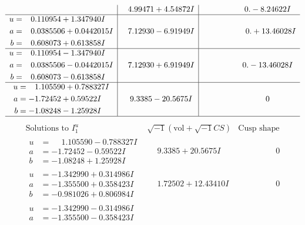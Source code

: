 \documentclass[1p]{elsarticle_modified}
\theoremstyle{definition}
\newcommand{\I}{\sqrt{-1}}
\begin{document}
$$\begin{array}{c|c|c}
 & \phantom{-}4.99471 + 4.54872 I & \phantom{-0.000000 } 0. - 8.24622 I \\ \hline\begin{aligned}
u &= \phantom{-}0.110954 + 1.347940 I \\
a &= \phantom{-}0.0385506 + 0.0442015 I \\
b &= \phantom{-}0.608073 + 0.613858 I\end{aligned}
 & \phantom{-}7.12930 - 6.91949 I & \phantom{-0.000000 -}0. + 13.46028 I \\ \hline\begin{aligned}
u &= \phantom{-}0.110954 - 1.347940 I \\
a &= \phantom{-}0.0385506 - 0.0442015 I \\
b &= \phantom{-}0.608073 - 0.613858 I\end{aligned}
 & \phantom{-}7.12930 + 6.91949 I & \phantom{-0.000000 } 0. - 13.46028 I \\ \hline\begin{aligned}
u &= \phantom{-}1.105590 + 0.788327 I \\
a &= -1.72452 + 0.59522 I \\
b &= -1.08248 - 1.25928 I\end{aligned}
 & \phantom{-}9.3385 - 20.5675 I & \phantom{-0.000000 } 0\\
 \hline 
 \end{array}$$\newpage$$\begin{array}{c|c|c}  
\text{Solutions to }I^u_{1}& \I (\text{vol} + \sqrt{-1}CS) & \text{Cusp shape}\\
 \hline 
\begin{aligned}
u &= \phantom{-}1.105590 - 0.788327 I \\
a &= -1.72452 - 0.59522 I \\
b &= -1.08248 + 1.25928 I\end{aligned}
 & \phantom{-}9.3385 + 20.5675 I & \phantom{-0.000000 } 0 \\ \hline\begin{aligned}
u &= -1.342990 + 0.314986 I \\
a &= -1.355500 + 0.358423 I \\
b &= -0.981026 + 0.806984 I\end{aligned}
 & \phantom{-}1.72502 + 12.43410 I & \phantom{-0.000000 } 0 \\ \hline\begin{aligned}
u &= -1.342990 - 0.314986 I \\
a &= -1.355500 - 0.358423 I \\

\end{aligned}
\end{array}$$
\end{document}
